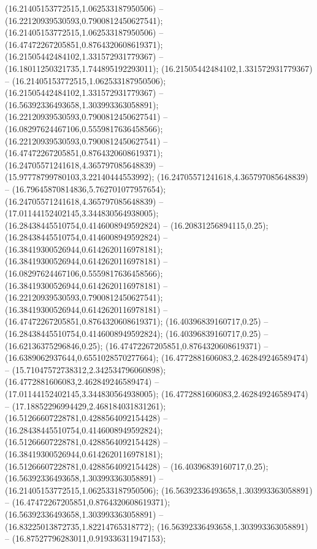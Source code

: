  (16.21405153772515,1.062533187950506) -- (16.22120939530593,0.7900812450627541);
 (16.21405153772515,1.062533187950506) -- (16.47472267205851,0.8764320608619371);
 (16.21505442484102,1.331572931779367) -- (16.18011250321735,1.744895192293011);
 (16.21505442484102,1.331572931779367) -- (16.21405153772515,1.062533187950506);
 (16.21505442484102,1.331572931779367) -- (16.56392336493658,1.303993363058891);
 (16.22120939530593,0.7900812450627541) -- (16.08297624467106,0.5559817636458566);
 (16.22120939530593,0.7900812450627541) -- (16.47472267205851,0.8764320608619371);
 (16.24705571241618,4.365797085648839) -- (15.97778799780103,3.22140444553992);
 (16.24705571241618,4.365797085648839) -- (16.79645870814836,5.762701077957654);
 (16.24705571241618,4.365797085648839) -- (17.01144152402145,3.344830564938005);
 (16.28438445510754,0.4146008949592824) -- (16.20831256894115,0.25);
 (16.28438445510754,0.4146008949592824) -- (16.38419300526944,0.6142620116978181);
 (16.38419300526944,0.6142620116978181) -- (16.08297624467106,0.5559817636458566);
 (16.38419300526944,0.6142620116978181) -- (16.22120939530593,0.7900812450627541);
 (16.38419300526944,0.6142620116978181) -- (16.47472267205851,0.8764320608619371);
 (16.40396839160717,0.25) -- (16.28438445510754,0.4146008949592824);
 (16.40396839160717,0.25) -- (16.62136375296846,0.25);
 (16.47472267205851,0.8764320608619371) -- (16.6389062937644,0.6551028570277664);
 (16.4772881606083,2.462849246589474) -- (15.71047572738312,2.342534796060898);
 (16.4772881606083,2.462849246589474) -- (17.01144152402145,3.344830564938005);
 (16.4772881606083,2.462849246589474) -- (17.18852296994429,2.468184031831261);
 (16.51266607228781,0.4288564092154428) -- (16.28438445510754,0.4146008949592824);
 (16.51266607228781,0.4288564092154428) -- (16.38419300526944,0.6142620116978181);
 (16.51266607228781,0.4288564092154428) -- (16.40396839160717,0.25);
 (16.56392336493658,1.303993363058891) -- (16.21405153772515,1.062533187950506);
 (16.56392336493658,1.303993363058891) -- (16.47472267205851,0.8764320608619371);
 (16.56392336493658,1.303993363058891) -- (16.83225013872735,1.82214765318772);
 (16.56392336493658,1.303993363058891) -- (16.87527796283011,0.919336311947153);
